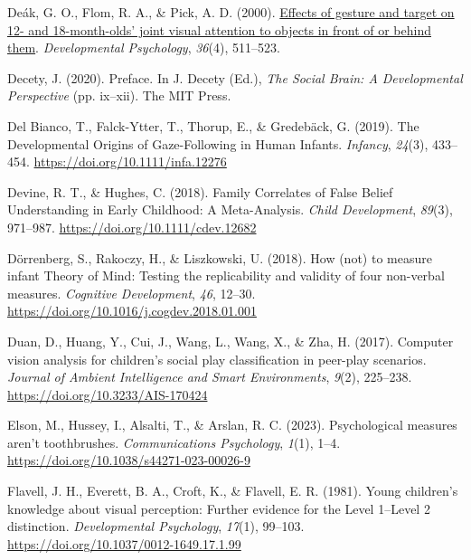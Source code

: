 \documentclass[
]{scrbook}
\newlength{\cslhangindent}
\newenvironment{CSLReferences}[2] %
 {\begin{list}{}{%
  \setlength{\itemindent}{0pt}
  \setlength{\leftmargin}{0pt}
  \setlength{\parsep}{0pt}
  \ifodd #1
   \setlength{\leftmargin}{\cslhangindent}
   \setlength{\itemindent}{-1\cslhangindent}
  \fi
  \setlength{\itemsep}{#2\baselineskip}}}
 {\end{list}}
\begin{document}
\begin{CSLReferences}{1}{0}
Deák, G. O., Flom, R. A., \& Pick, A. D. (2000). \href{https://www.ncbi.nlm.nih.gov/pubmed/10902702}{Effects of gesture and target on 12- and 18-month-olds' joint visual attention to objects in front of or behind them}. \emph{Developmental Psychology}, \emph{36}(4), 511--523.

Decety, J. (2020). Preface. In J. Decety (Ed.), \emph{The {Social Brain}: {A Developmental Perspective}} (pp. ix--xii). The MIT Press.

Del Bianco, T., Falck-Ytter, T., Thorup, E., \& Gredebäck, G. (2019). The {Developmental Origins} of {Gaze-Following} in {Human Infants}. \emph{Infancy}, \emph{24}(3), 433--454. \url{https://doi.org/10.1111/infa.12276}

Devine, R. T., \& Hughes, C. (2018). Family {Correlates} of {False Belief Understanding} in {Early Childhood}: {A Meta-Analysis}. \emph{Child Development}, \emph{89}(3), 971--987. \url{https://doi.org/10.1111/cdev.12682}

Dörrenberg, S., Rakoczy, H., \& Liszkowski, U. (2018). How (not) to measure infant {Theory} of {Mind}: {Testing} the replicability and validity of four non-verbal measures. \emph{Cognitive Development}, \emph{46}, 12--30. \url{https://doi.org/10.1016/j.cogdev.2018.01.001}

Duan, D., Huang, Y., Cui, J., Wang, L., Wang, X., \& Zha, H. (2017). Computer vision analysis for children's social play classification in peer-play scenarios. \emph{Journal of Ambient Intelligence and Smart Environments}, \emph{9}(2), 225--238. \url{https://doi.org/10.3233/AIS-170424}

Elson, M., Hussey, I., Alsalti, T., \& Arslan, R. C. (2023). Psychological measures aren't toothbrushes. \emph{Communications Psychology}, \emph{1}(1), 1--4. \url{https://doi.org/10.1038/s44271-023-00026-9}

Flavell, J. H., Everett, B. A., Croft, K., \& Flavell, E. R. (1981). Young children's knowledge about visual perception: {Further} evidence for the {Level} 1--{Level} 2 distinction. \emph{Developmental Psychology}, \emph{17}(1), 99--103. \url{https://doi.org/10.1037/0012-1649.17.1.99}


\end{CSLReferences}
\end{document}
